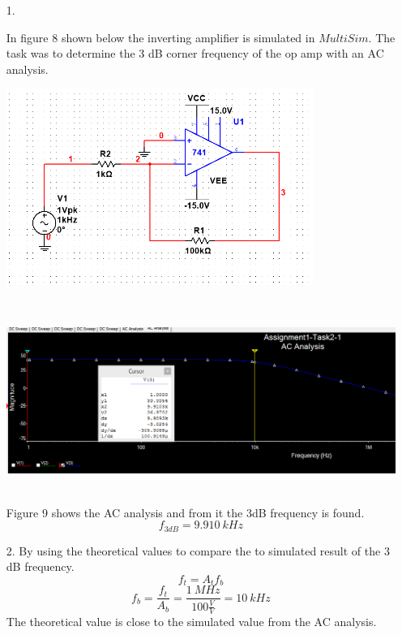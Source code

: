 \documentclass[11pt,a4paper]{article}
\begin{document}
\begin{enumerate}
  \item[1.]
  
  In figure 8 shown below the inverting amplifier is simulated in $MultiSim$. The task was to determine the 3 dB corner frequency of the op amp with an AC analysis.\\
  \begin{minipage}{\linewidth}
  \centering
      \includegraphics[width=10cm]{Task2-1-Circuit}\\
    \end{minipage}\\
\pagebreak 


  \begin{minipage}{\linewidth}
  \centering
      \includegraphics[width=14cm]{Task2-1-ACAnalysis}\\
    \end{minipage}\\
    
Figure 9 shows the AC analysis and from it the 3dB  frequency is found.
$$ f_{3dB} = 9.910 \ kHz $$

  \item[2.]
  By using the theoretical values to compare the to simulated result of the 3 dB frequency.
$$f_{t} = A_{t}f_{b}$$
$$ f_{b} = \frac{f_{t}}{A_{b}} = \frac{1\ MHz}{100 \frac{V}{V}} = 10\ kHz $$
The theoretical value is close to the simulated value from the AC analysis.  

\end{enumerate}
\pagebreak
\end{document}
